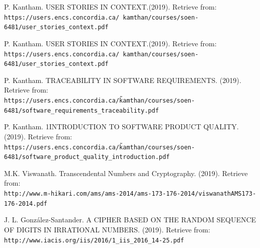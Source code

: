 \documentclass{report}
\begin{document}
\newpage
\newpage
\begin{thebibliography}{9}

P. Kantham. USER STORIES IN CONTEXT.(2019). Retrieve from:
\\\texttt{https://users.encs.concordia.ca/~kamthan/courses/soen-6481/user\_stories\_context.pdf}


P. Kantham. USER STORIES IN CONTEXT.(2019). Retrieve from:
\\\texttt{https://users.encs.concordia.ca/~kamthan/courses/soen-6481/user\_stories\_context.pdf}

P. Kantham. TRACEABILITY IN SOFTWARE REQUIREMENTS. (2019). Retrieve from:
\\\texttt{https://users.encs.concordia.ca/\~kamthan/courses/soen-6481/software\_requirements\_traceability.pdf}

P. Kantham. 1INTRODUCTION TO SOFTWARE PRODUCT QUALITY. (2019). Retrieve from:
\\\texttt{https://users.encs.concordia.ca/\~kamthan/courses/soen-6481/software\_product\_quality\_introduction.pdf}

M.K. Viswanath. Transcendental Numbers and Cryptography. (2019). Retrieve from:
\\\texttt{http://www.m-hikari.com/ams/ams-2014/ams-173-176-2014/viswanathAMS173-176-2014.pdf}

J. L. González-Santander. A CIPHER BASED ON THE RANDOM SEQUENCE OF DIGITS IN IRRATIONAL NUMBERS. (2019). Retrieve from:
\\\texttt{http://www.iacis.org/iis/2016/1\_iis\_2016\_14-25.pdf}

\end{thebibliography}
\end{document}
